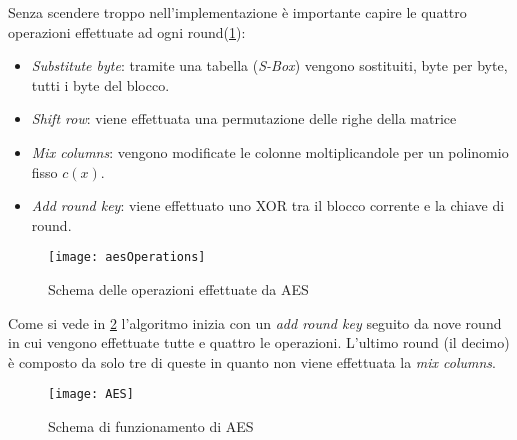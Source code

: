 				Senza scendere troppo nell'implementazione è importante capire le quattro operazioni effettuate ad ogni round(\cref{fig:operations}):
				
				\begin{itemize}
					\item \emph{Substitute byte}: tramite una tabella (\emph{S-Box}) vengono sostituiti, byte per byte, tutti i byte del blocco.
					\item \emph{Shift row}: viene effettuata una permutazione delle righe della matrice
					\item \emph{Mix columns}: vengono modificate le colonne moltiplicandole per un polinomio fisso $c(x)$.
					\item \emph{Add round key}: viene effettuato uno XOR tra il blocco corrente e la chiave di round.
				\end{itemize}
			
				\begin{figure}
					\begin{center}
						\texttt{[image: aesOperations]}
						\caption{Schema delle operazioni effettuate da AES}
						\label{fig:operations}
					\end{center}
				\end{figure}
			
				Come si vede in \cref{fig:aes} l'algoritmo inizia con un \emph{add round key} seguito da nove round in cui vengono effettuate tutte e quattro le operazioni. L'ultimo round (il decimo) è composto da solo tre di queste in quanto non viene effettuata la \emph{mix columns}.
				
				\begin{figure}
					\begin{center}
						\texttt{[image: AES]}
						\caption{Schema di funzionamento di AES}
						\label{fig:aes}
					\end{center}
				\end{figure}
				
